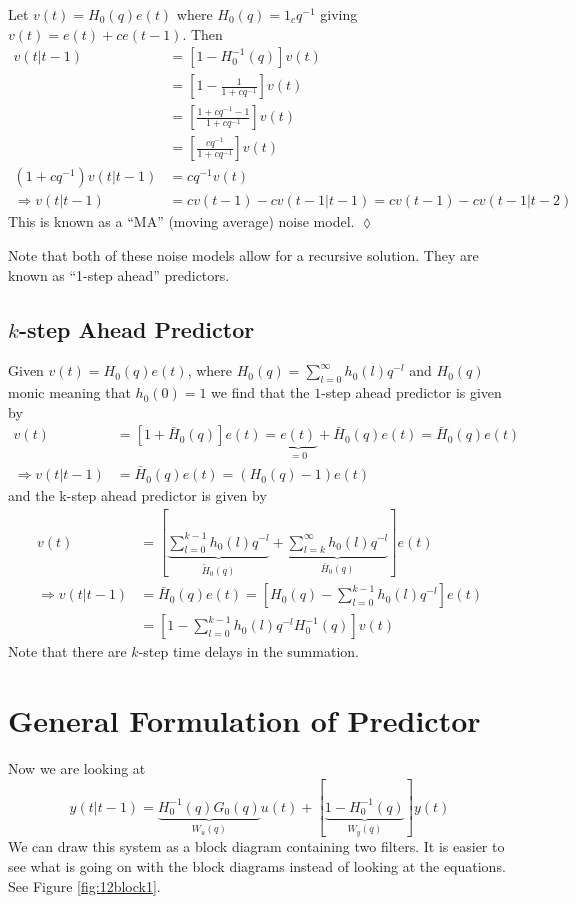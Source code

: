 \begin{example}
Let $v(t)=H_0(q)e(t)$ where $H_0(q)=1_cq^{-1}$ giving $v(t)=e(t)+ce(t-1)$. Then
\begin{align*}
v(t|t-1) &= [1-H_0^{-1}(q)]v(t) \\
&= \left[1-\frac{1}{1+cq^{-1}}\right]v(t) \\
&= \left[\frac{1+cq^{-1}-1}{1+cq^{-1}}\right]v(t) \\
&= \left[\frac{cq^{-1}}{1+cq^{-1}}\right]v(t) \\
(1+cq^{-1})v(t|t-1) &= cq^{-1}v(t) \\
\Rightarrow v(t|t-1) &= cv(t-1)-cv(t-1|t-1) = cv(t-1)-cv(t-1|t-2)
\end{align*}
This is known as a ``MA'' (moving average) noise model.
$\lozenge$
\end{example}

Note that both of these noise models allow for a recursive solution. They are known as ``1-step ahead'' predictors.

\subsection{$k$-step Ahead Predictor}
Given $v(t)=H_0(q)e(t)$, where $H_0(q)=\sum_{l=0}^\infty h_0(l)q^{-l}$ and $H_0(q)$ monic meaning that $h_0(0)=1$ we find that the $1$-step ahead predictor is given by
\begin{align*}
v(t) &= [1+\bar{H}_0(q)]e(t) = \underbrace{e(t)}_{=0}+\bar{H}_0(q)e(t) = \bar{H}_0(q)e(t) \\
\Rightarrow v(t|t-1) &= \bar{H}_0(q)e(t) = (H_0(q)-1)e(t)
\end{align*}
and the k-step ahead predictor is given by
\begin{align*}
v(t) &= \left[\underbrace{\sum_{l=0}^{k-1}h_0(l)q^{-l}}_{\tilde{H}_0(q)} + \underbrace{\sum_{l=k}^\infty h_0(l)q^{-l}}_{\bar{H}_0(q)}\right]e(t) \\
\Rightarrow v(t|t-1) &= \bar{H}_0(q)e(t) = \left[H_0(q)-\sum_{l=0}^{k-1}h_0(l)q^{-l}\right]e(t) \\
&= \left[1-\sum_{l=0}^{k-1}h_0(l)q^{-l}H_0^{-1}(q)\right]v(t)
\end{align*}
Note that there are $k$-step time delays in the summation.

\section{General Formulation of Predictor}
Now we are looking at
$$y(t|t-1) = \underbrace{H_0^{-1}(q)G_0(q)}_{W_u(q)}u(t) + [\underbrace{1-H_0^{-1}(q)}_{W_y(q)}]y(t)$$
We can draw this system as a block diagram containing two filters. It is easier to see what is going on with the block diagrams instead of looking at the equations. See Figure \ref{fig:12block1}.

